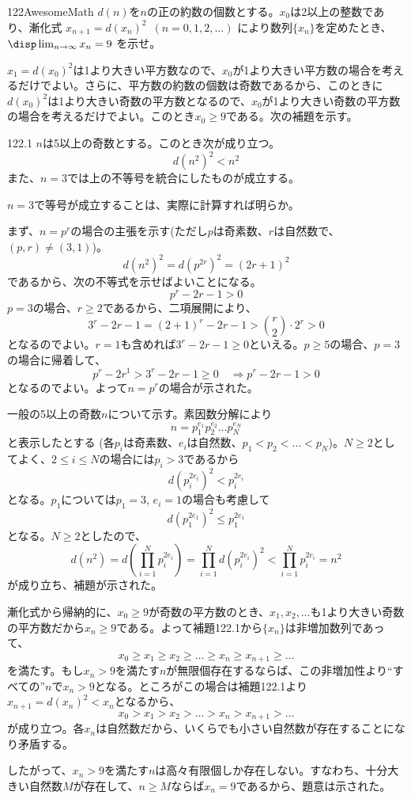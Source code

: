 \begin{prob}{122}{}{AwesomeMath}
 $d(n)$を$n$の正の約数の個数とする。$x_0$は2以上の整数であり、漸化式 $x_{n+1}=d(x_n)^2$~$(n=0, 1, 2, \ldots)$ により数列$\{x_n\}$を定めたとき、$\disp \lim_{n\to\infty} x_n = 9$ を示せ。
\end{prob}
$x_1=d(x_0)^2$は1より大きい平方数なので、$x_0$が1より大きい平方数の場合を考えるだけでよい。さらに、平方数の約数の個数は奇数であるから、このときに$d(x_0)^2$は1より大きい奇数の平方数となるので、$x_0$が1より大きい奇数の平方数の場合を考えるだけでよい。このとき$x_0\ge 9$である。次の補題を示す。

\begin{subthm}{122.1}
 $n$は5以上の奇数とする。このとき次が成り立つ。
 \[ d(n^2)^2<n^2 \]
 また、$n=3$では上の不等号を統合にしたものが成立する。
\end{subthm}

$n=3$で等号が成立することは、実際に計算すれば明らか。

まず、$n=p^r$の場合の主張を示す(ただし$p$は奇素数、$r$は自然数で、$(p,r)\neq (3, 1)$)。
\[ d(n^2)^2=d(p^{2r})^2=(2r+1)^2 \]
であるから、次の不等式を示せばよいことになる。
\[ p^r-2r-1>0 \]
$p=3$の場合、$r\ge 2$であるから、二項展開により、
\[ 3^r-2r-1=(2+1)^r-2r-1>\binom{r}{2}\cdot 2^r > 0 \]
となるのでよい。$r=1$も含めれば$3^r-2r-1\ge 0$といえる。$p\ge 5$の場合、$p=3$の場合に帰着して、
\[ p^r-2r^1>3^r-2r-1\ge 0 \quad\Rightarrow p^r-2r-1>0 \]
となるのでよい。よって$n=p^r$の場合が示された。

一般の5以上の奇数$n$について示す。素因数分解により
\[ n=p_1^{e_1}p_2^{e_2}\dots p_N^{e_N} \]
と表示したとする (各$p_i$は奇素数、$e_i$は自然数、$p_1<p_2<\dots <p_N$)。$N\ge 2$としてよく、$2\le i\le N$の場合には$p_i>3$であるから
\[ d(p_i^{2e_i})^2<p_i^{2e_i} \]
となる。$p_1$については$p_1=3$, $e_i=1$の場合も考慮して
\[ d(p_1^{2e_1})^2\le p_1^{2e_1} \]
となる。$N\ge 2$としたので、
\[ d(n^2)=d\left(\prod_{i=1}^N p_i^{2e_i}\right) = \prod_{i=1}^N d(p_i^{2e_i})^2<\prod_{i=1}^Np_i^{2e_i}=n^2 \]
が成り立ち、補題が示された。

漸化式から帰納的に、$x_0\ge 9$が奇数の平方数のとき、$x_1, x_2, \dots$も1より大きい奇数の平方数だから$x_n\ge 9$である。よって補題122.1から$\{x_n\}$は非増加数列であって、
\[ x_0\ge x_1\ge x_2\ge \dots \ge x_n \ge x_{n+1}\ge \dots \]
を満たす。もし$x_n>9$を満たす$n$が無限個存在するならば、この非増加性より``すべての''$n$で$x_n>9$となる。ところがこの場合は補題122.1より$x_{n+1}=d(x_n)^2<x_n$となるから、
\[ x_0>x_1>x_2>\dots > x_n>x_{n+1}>\dots \]
が成り立つ。各$x_n$は自然数だから、いくらでも小さい自然数が存在することになり矛盾する。

したがって、$x_n>9$を満たす$n$は高々有限個しか存在しない。すなわち、十分大きい自然数$M$が存在して、$n\ge M$ならば$x_n=9$であるから、題意は示された。